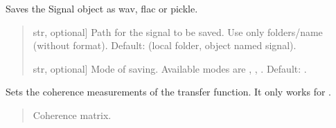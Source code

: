 \documentclass[letterpaper,10pt,english]{sphinxmanual}
\begin{document}
\begin{fulllineitems}
\begin{fulllineitems}
\label{\detokenize{classes:dsptoolbox.classes.signal_class.Signal.save_signal}}
\pysigstartsignatures
{}
\pysigstopsignatures
\sphinxAtStartPar
Saves the Signal object as wav, flac or pickle.
\begin{quote}\begin{description}
\begin{description}
\sphinxlineitem{\sphinxstylestrong{path}}{[}str, optional{]}
\sphinxAtStartPar
Path for the signal to be saved. Use only folders/name
(without format). Default: 
(local folder, object named signal).

\sphinxlineitem{\sphinxstylestrong{mode}}{[}str, optional{]}
\sphinxAtStartPar
Mode of saving. Available modes are , , .
Default: .

\end{description}

\end{description}\end{quote}

\end{fulllineitems}


\begin{fulllineitems}
\label{\detokenize{classes:dsptoolbox.classes.signal_class.Signal.set_coherence}}
\pysigstartsignatures
{}
\pysigstopsignatures
\sphinxAtStartPar
Sets the coherence measurements of the transfer function.
It only works for .
\begin{quote}\begin{description}
\begin{description}
\sphinxlineitem{\sphinxstylestrong{coherence}}{[}\sphinxtitleref{np.ndarray}{]}
\sphinxAtStartPar
Coherence matrix.


\end{description}
\end{description}
\end{quote}
\end{fulllineitems}
\end{fulllineitems}
\end{document}
